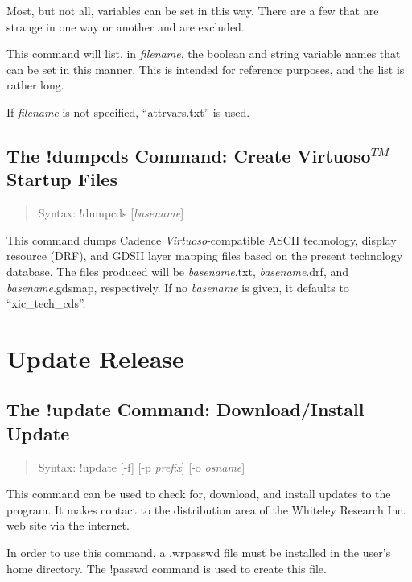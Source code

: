 Most, but not all, variables can be set in this way.  There are a few
that are strange in one way or another and are excluded.

This command will list, in {\it filename\/}, the boolean and string
variable names that can be set in this manner.  This is intended for
reference purposes, and the list is rather long.

If {\it filename} is not specified, ``{\vt attrvars.txt}'' is used.

\subsection{The {\cb !dumpcds} Command: Create Virtuoso$^{TM}$ Startup Files}
\begin{quote}
Syntax: {\vt !dumpcds} [{\it basename\/}]
\end{quote}
This command dumps Cadence {\it Virtuoso\/}-compatible ASCII
technology, display resource (DRF), and GDSII layer mapping files
based on the present {\Xic} technology database.  The files produced
will be {\it basename\/}{\vt .txt}, {\it basename\/}{\vt .drf}, and
{\it basename\/}{\vt .gdsmap}, respectively.  If no {\it basename} is
given, it defaults to ``{\vt xic\_tech\_cds}''.


\section{Update Release}

\subsection{The {\cb !update} Command: Download/Install Update}
\begin{quote}
Syntax: {\vt !update} [{\vt -f}] [{\vt -p} {\it prefix\/}]
  [{\vt -o} {\it osname\/}]
\end{quote}
This command can be used to check for, download, and install updates
to the program.  It makes contact to the distribution area of the
Whiteley Research Inc.  web site via the internet.

In order to use this command, a {\vt .wrpasswd} file must be installed
in the user's home directory.  The {\cb !passwd} command is used to
create this file.

